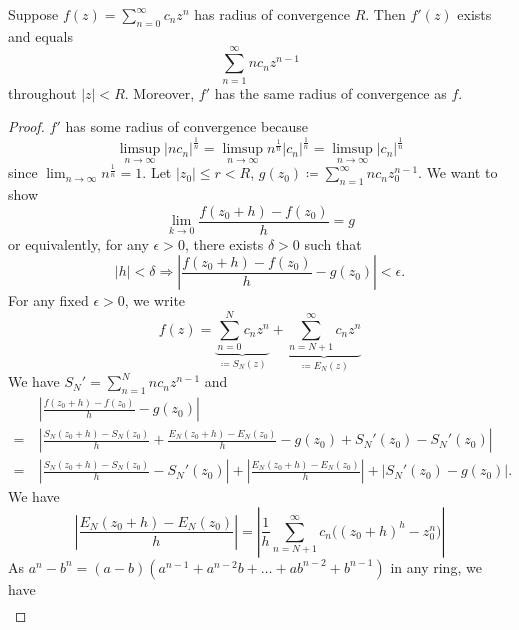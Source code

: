 \documentclass[11pt]{article}
\begin{document}
\begin{theorem}
Suppose $\displaystyle f(z) = \sum^\infty_{n=0}c_nz^n$ has radius of
convergence $R$. Then $f'(z)$ exists and equals
\begin{equation*}
\sum^{\infty}_{n=1} nc_nz^{n-1}
\end{equation*}
throughout $|z| < R$. Moreover, $f'$ has the same radius of convergence as $f$.
\label{theorem4}
\end{theorem}
\begin{proof}
$f'$ has some radius of convergence because
\begin{equation*}
\limsup_{n\to\infty}|nc_n|^{\frac{1}{n}}
= \limsup_{n\to\infty}n^{\frac{1}{n}}|c_n|^{\frac{1}{n}}
= \limsup_{n\to\infty}|c_n|^{\frac{1}{n}}
\end{equation*}
since $\displaystyle\lim_{n\to\infty}n^{\frac{1}{n}} = 1$. Let $|z_0| \leq r <
R$, $\displaystyle g(z_0) \coloneqq \sum^\infty_{n=1} nc_nz_0^{n-1}$. We want to
show
\begin{equation*}
\lim_{k\to 0} \frac{f(z_0+h) - f(z_0)}{h} = g
\end{equation*}
or equivalently, for any $\epsilon > 0$, there exists $\delta > 0$ such that
\begin{equation*}
|h| < \delta \Rightarrow \left|\frac{f(z_0+h) - f(z_0)}{h} - g(z_0)\right| <
\epsilon.
\end{equation*}
For any fixed $\epsilon > 0$, we write
\begin{equation*}
f(z) = \underbrace{\sum^N_{n=0}c_nz^n}_{\coloneqq S_N(z)} +
\underbrace{\sum^\infty_{n=N+1}c_nz^n}_{\coloneqq E_N(z)} 
\end{equation*}
We have $S_N' = \sum^N_{n=1}nc_nz^{n-1}$ and
\begin{align*}
&\>\left|\frac{f(z_0+h) - f(z_0)}{h} - g(z_0)\right|\\
=&\> \left|\frac{S_N(z_0+h) - S_N(z_0)}{h} + \frac{E_N(z_0+h) - E_N(z_0)}{h} -
g(z_0) + S_N'(z_0) -S_N'(z_0)\right|\\
=&\> \left|\frac{S_N(z_0+h) - S_N(z_0)}{h} - S_N'(z_0) \right|
+ \left|\frac{E_N(z_0+h) - E_N(z_0)}{h}\right| + \left|S_N'(z_0) -
g(z_0)\right|.
\end{align*}
We have
\begin{equation*}
\left|\frac{E_N(z_0+h) - E_N(z_0)}{h}\right|
= \left|\frac{1}{h} \sum^\infty_{n=N+1}c_n \big((z_0+h)^h -z_0^n\big)\right|
\end{equation*}
As $a^n -b^n = (a-b)(a^{n-1} + a^{n-2}b + \dots+ab^{n-2} + b^{n-1})$ in any
ring, we have
\begin{align*}

\end{align*}
\end{proof}
\end{document}
